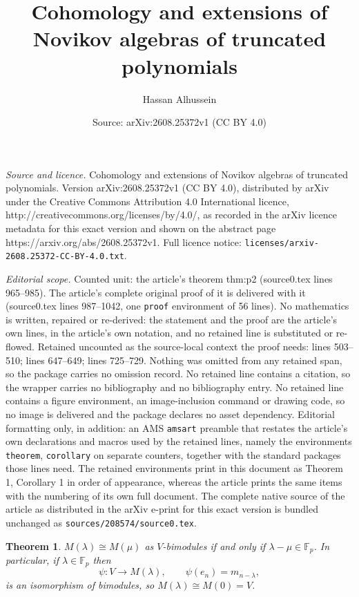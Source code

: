 \documentclass[10pt,a4paper]{amsart}
\title{Cohomology and extensions of Novikov algebras of truncated polynomials}
\author{Hassan Alhussein}
\date{Source: arXiv:2608.25372v1 (CC BY 4.0)}
\newtheorem{theorem}{Theorem}
\newcommand{\Fp}{\mathbb{F}_p}
\begin{document}
\maketitle

\noindent\emph{Source and licence.} Cohomology and extensions of Novikov algebras of truncated polynomials. Version arXiv:2608.25372v1 (CC BY 4.0), distributed by arXiv under the Creative Commons Attribution 4.0 International licence, http://creativecommons.org/licenses/by/4.0/, as recorded in the arXiv licence metadata for this exact version and shown on the abstract page https://arxiv.org/abs/2608.25372v1. Full licence notice: \texttt{licenses/arxiv-2608.25372-CC-BY-4.0.txt}.\par\smallskip

\noindent\textit{Editorial scope.} Counted unit: the article's theorem thm:p2 (source0.tex lines 965--985). The article's complete original proof of it is delivered with it (source0.tex lines 987--1042, one \texttt{proof} environment of 56 lines). No mathematics is written, repaired or re-derived: the statement and the proof are the article's own lines, in the article's own notation, and no retained line is substituted or re-flowed.  Retained uncounted as the source-local context the proof needs: lines 503--510; lines 647--649; lines 725--729.  Nothing was omitted from any retained span, so the package carries no omission record.  No retained line contains a citation, so the wrapper carries no bibliography and no bibliography entry.  No retained line contains a figure environment, an image-inclusion command or drawing code, so no image is delivered and the package declares no asset dependency.  Editorial formatting only, in addition: an AMS \texttt{amsart} preamble that restates the article's own declarations and macros used by the retained lines, namely the environments \texttt{theorem}, \texttt{corollary} on separate counters, together with the standard packages those lines need.  The retained environments print in this document as Theorem 1, Corollary 1 in order of appearance, whereas the article prints the same items with the numbering of its own full document.  The complete native source of the article as distributed in the arXiv e-print for this exact version is bundled unchanged as \texttt{sources/208574/source0.tex}.
\begin{theorem}\label{thm:iso}
$M(\lambda)\cong M(\mu)$ as $V$-bimodules if and only if $\lambda-\mu\in\Fp$. In particular,
if $\lambda\in\Fp$ then
\[
\psi:V\longrightarrow M(\lambda),\qquad \psi(e_n)=m_{n-\lambda},
\]
is an isomorphism of bimodules, so $M(\lambda)\cong M(0)=V$.
\end{theorem}
\end{document}
